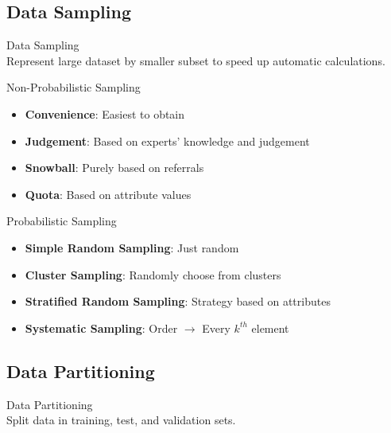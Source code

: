 
\subsection{Data Sampling}

\begin{definition}{Data Sampling}\\
Represent large dataset by smaller subset to speed up automatic calculations.
\end{definition}

\begin{concept}{Non-Probabilistic Sampling}
\begin{itemize}
    \item \textbf{Convenience}: Easiest to obtain
    \item \textbf{Judgement}: Based on experts' knowledge and judgement
    \item \textbf{Snowball}: Purely based on referrals
    \item \textbf{Quota}: Based on attribute values
\end{itemize}
\end{concept}

\begin{concept}{Probabilistic Sampling}
\begin{itemize}
    \item \textbf{Simple Random Sampling}: Just random
    \item \textbf{Cluster Sampling}: Randomly choose from clusters
    \item \textbf{Stratified Random Sampling}: Strategy based on attributes
    \item \textbf{Systematic Sampling}: Order $\rightarrow$ Every $k^{th}$ element
\end{itemize}
\end{concept}


\subsection{Data Partitioning}

\begin{definition}{Data Partitioning}\\
Split data in training, test, and validation sets.
\end{definition}

